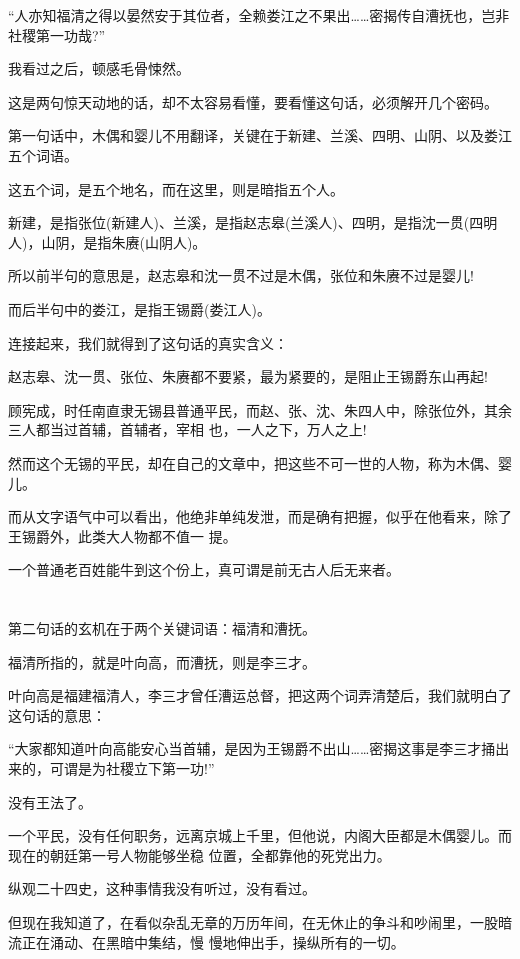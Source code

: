 \documentclass[11pt,a4paper,onecolumn]{article}
\begin{document}
``人亦知福清之得以晏然安于其位者，全赖娄江之不果出……密揭传自漕抚也，岂非社稷第一功哉?''

我看过之后，顿感毛骨悚然。

这是两句惊天动地的话，却不太容易看懂，要看懂这句话，必须解开几个密码。

第一句话中，木偶和婴儿不用翻译，关键在于新建、兰溪、四明、山阴、以及娄江五个词语。

这五个词，是五个地名，而在这里，则是暗指五个人。

新建，是指张位(新建人)、兰溪，是指赵志皋(兰溪人)、四明，是指沈一贯(四明人)，山阴，是指朱赓(山阴人)。

所以前半句的意思是，赵志皋和沈一贯不过是木偶，张位和朱赓不过是婴儿!

而后半句中的娄江，是指王锡爵(娄江人)。

连接起来，我们就得到了这句话的真实含义：

赵志皋、沈一贯、张位、朱赓都不要紧，最为紧要的，是阻止王锡爵东山再起!

顾宪成，时任南直隶无锡县普通平民，而赵、张、沈、朱四人中，除张位外，其余三人都当过首辅，首辅者，宰相
也，一人之下，万人之上!

然而这个无锡的平民，却在自己的文章中，把这些不可一世的人物，称为木偶、婴儿。

而从文字语气中可以看出，他绝非单纯发泄，而是确有把握，似乎在他看来，除了王锡爵外，此类大人物都不值一
提。

一个普通老百姓能牛到这个份上，真可谓是前无古人后无来者。

\section[\thesection]{}

第二句话的玄机在于两个关键词语：福清和漕抚。

福清所指的，就是叶向高，而漕抚，则是李三才。

叶向高是福建福清人，李三才曾任漕运总督，把这两个词弄清楚后，我们就明白了这句话的意思：

``大家都知道叶向高能安心当首辅，是因为王锡爵不出山……密揭这事是李三才捅出来的，可谓是为社稷立下第一功!''

没有王法了。

一个平民，没有任何职务，远离京城上千里，但他说，内阁大臣都是木偶婴儿。而现在的朝廷第一号人物能够坐稳
位置，全都靠他的死党出力。

纵观二十四史，这种事情我没有听过，没有看过。

但现在我知道了，在看似杂乱无章的万历年间，在无休止的争斗和吵闹里，一股暗流正在涌动、在黑暗中集结，慢
慢地伸出手，操纵所有的一切。
\end{document}
